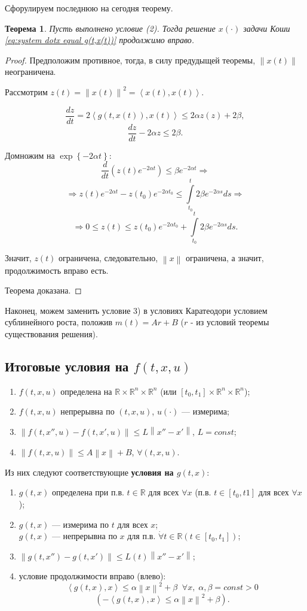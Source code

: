 \documentclass[12pt, a4paper]{article}
\theoremstyle{rusdef}
\newtheorem{theorem}{Теорема}
\newcommand\scalar[1]{\left < #1 \right >} %
\newcommand{\R}{\ensuremath{\mathbb{R}}} %
\newcommand{\norm}[1]{\left\lVert #1 \right\rVert} %
\DeclareMathOperator*{\thus}{\Rightarrow} %
\begin{document}
Сфорулируем последнюю на сегодня теорему.

\begin{theorem}
Пусть выполнено условие (2). Тогда решение $x(\cdot)$ задачи Коши \eqref{eq:system dotx equal g(t,x(t))} продолжимо вправо.
\end{theorem}
\begin{proof}
Предположим противное, тогда, в силу предудыщей теоремы, $\norm{x(t)}$ неограничена.

Рассмотрим $z(t) = \norm{x(t)}^2 = \scalar{x(t), x(t)}$.

$$
\frac{dz}{dt} = 2 \scalar{g(t, x(t)), x(t)} \leqslant 2 \alpha z(z) + 2\beta,
$$
$$
\frac{dz}{dt} - 2 \alpha z \leqslant 2\beta.
$$

Домножим на $\exp \left\{ -2\alpha t \right\}$:
$$
\frac{d}{dt}\left( z(t) e^{-2\alpha t} \right) \leqslant \beta e^{-2\alpha t} \thus
$$
$$
\thus z(t) e^{-2\alpha t} - z(t_0) e^{-2\alpha t_0} \leqslant \int\limits_{t_0}^{t} 2 \beta e^{-2 \alpha s} ds \thus
$$
$$
\thus 0 \leqslant z(t) \leqslant z(t_0) e^{-2\alpha t_0} + \int\limits_{t_0}^{t} 2 \beta e^{-2 \alpha s} ds.
$$

Значит, $z(t)$ ограничена, следовательно, $\norm{x}$ ограничена, а значит, продолжимость вправо есть.

Теорема доказана.
\end{proof}

Наконец, можем заменить условие 3) в условиях Каратеодори условием сублинейного роста, положив $m(t) = Ar + B$ ($r$ - из условий теоремы существования решения).

\subsection*{Итоговые условия на $f(t,x,u)$}
\begin{enumerate}
\item $f(t,x,u)$ определена на $\R \times \R^n \times \R^n$ (или $[t_0, t_1] \times \R^n \times \R^n$);
\item $f(t,x,u)$ непрерывна по $(t,x,u)$, $u(\cdot)$ --- измерима;
\item $\norm{f(t,x'',u) - f(t,x',u)} \leqslant L \norm{x'' - x'}$, $L = const$;
\item $\norm{f(t,x,u)} \leqslant A \norm{x} + B$, $\forall(t,x,u)$.
\end{enumerate}
Из них следуют соответствующие \textbf{условия на $g(t,x)$}:
\begin{enumerate}
\item $g(t,x)$ определена при п.в. $t \in \R$ для всех $\forall x$ (п.в. $t \in [t_0, t1]$ для всех $\forall x$);
\item $g(t,x)$ --- измерима по $t$ для всех $x$;\\
	  $g(t,x)$ --- непрерывна по $x$ для п.в. $\dot{\forall} t \in \R (t \in [t_0, t_1])$;
\item $\norm{g(t,x'') - g(t,x')} \leqslant L(t) \norm{x'' - x'}$;
\item условие продолжимости вправо (влево):
$$
\scalar{g(t,x), x} \leqslant \alpha \norm{x}^2 + \beta \;\; \forall x, \; \alpha, \beta = const > 0
$$
$$
(-\scalar{g(t,x), x} \leqslant \alpha \norm{x}^2 + \beta).
$$
\end{enumerate}
\end{document}
